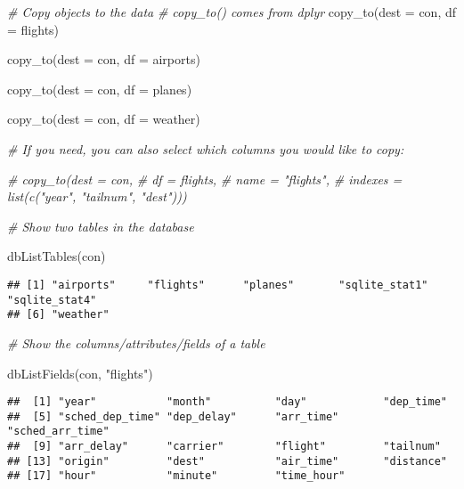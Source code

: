 \documentclass[
]{book}
\newenvironment{Shaded}{\begin{snugshade}}{\end{snugshade}}
\newcommand{\AttributeTok}[1]{\textcolor[rgb]{0.77,0.63,0.00}{#1}}
\newcommand{\CommentTok}[1]{\textcolor[rgb]{0.56,0.35,0.01}{\textit{#1}}}
\newcommand{\FunctionTok}[1]{\textcolor[rgb]{0.00,0.00,0.00}{#1}}
\newcommand{\NormalTok}[1]{#1}
\newcommand{\StringTok}[1]{\textcolor[rgb]{0.31,0.60,0.02}{#1}}
\begin{document}
\begin{Shaded}
\begin{Highlighting}[]
\CommentTok{\# Copy objects to the data }
\CommentTok{\# copy\_to() comes from dplyr}
\FunctionTok{copy\_to}\NormalTok{(}\AttributeTok{dest =}\NormalTok{ con, }
        \AttributeTok{df =}\NormalTok{ flights)}

\FunctionTok{copy\_to}\NormalTok{(}\AttributeTok{dest =}\NormalTok{ con, }
        \AttributeTok{df =}\NormalTok{ airports)}

\FunctionTok{copy\_to}\NormalTok{(}\AttributeTok{dest =}\NormalTok{ con,}
        \AttributeTok{df =}\NormalTok{ planes)}

\FunctionTok{copy\_to}\NormalTok{(}\AttributeTok{dest =}\NormalTok{ con, }
        \AttributeTok{df =}\NormalTok{ weather)}

\CommentTok{\# If you need, you can also select which columns you would like to copy:}

\CommentTok{\# copy\_to(dest = con, }
\CommentTok{\#          df = flights, }
\CommentTok{\#          name = "flights",}
\CommentTok{\#          indexes = list(c("year", "tailnum", "dest")))}
\end{Highlighting}
\end{Shaded}

\begin{Shaded}
\begin{Highlighting}[]
\CommentTok{\# Show two tables in the database }

\FunctionTok{dbListTables}\NormalTok{(con)}
\end{Highlighting}
\end{Shaded}

\begin{verbatim}
## [1] "airports"     "flights"      "planes"       "sqlite_stat1" "sqlite_stat4"
## [6] "weather"
\end{verbatim}

\begin{Shaded}
\begin{Highlighting}[]
\CommentTok{\# Show the columns/attributes/fields of a table }

\FunctionTok{dbListFields}\NormalTok{(con, }\StringTok{"flights"}\NormalTok{)}
\end{Highlighting}
\end{Shaded}

\begin{verbatim}
##  [1] "year"           "month"          "day"            "dep_time"      
##  [5] "sched_dep_time" "dep_delay"      "arr_time"       "sched_arr_time"
##  [9] "arr_delay"      "carrier"        "flight"         "tailnum"       
## [13] "origin"         "dest"           "air_time"       "distance"      
## [17] "hour"           "minute"         "time_hour"
\end{verbatim}
\end{document}
